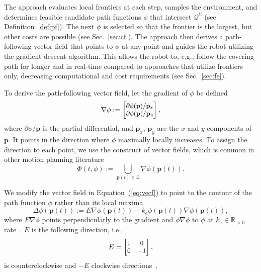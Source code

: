 \documentclass[lettersize,journal,twoside]{IEEEtran}
\theoremstyle{definition}
\begin{document}
The %
approach evaluates local frontiers at each step, samples the environment, and determines feasible candidate path functions $\phi$ that intersect $\mathcal{Q}^V$ (see Definition~\ref{def:pf}).
The next $\phi$ is selected so that the frontier is the largest, but other costs are possible (see Sec.~\ref{sec:cf}). 
The %
approach then derives a path-following vector field that points to $\phi$ at any point and guides the robot utilizing the gradient descent algorithm. This allows the robot to, e.g., follow the covering path for longer and in real-time compared to approaches that utilize frontiers only, decreasing computational and cost requirements (see Sec.~\ref{sec:fe}).

To derive the path-following vector field, let the gradient of $\phi$ be defined
\begin{equation}\small
  \nabla\phi:=\begin{bmatrix}
    \partial\phi(\mathbf{p})/\mathbf{p}_x\\
    \partial\phi(\mathbf{p})/\mathbf{p}_y
  \end{bmatrix},
\end{equation}
where $\partial\phi/\mathbf{p}$ is the partial differential, and $\mathbf{p}_x$, $\mathbf{p}_y$ are the $x$ and $y$ components of $\mathbf{p}$.
It points in the direction where $\phi$ maximally locally increases. To assign the direction to each point, we use the construct of vector fields, which is common in other motion planning literature~\cite{%
garcia2017guidance,goncalves2010vector}
\begin{equation}\label{eq:vecf}
  \Phi(t,\phi):={\textstyle \bigcup\limits_{\mathbf{p}(t)\in\mathcal{Q}}}\nabla\phi(\mathbf{p}(t)).
\end{equation}

We modify the vector field in Equation~(\ref{eq:vecf}) to point to the contour of the path function $\phi$ rather than its local maxima
\begin{equation}\label{eq:pfvf}
  \Delta\phi(\mathbf{p}(t)):=E\nabla\phi(\mathbf{p}(t))-k_e\phi(\mathbf{p}(t))\nabla\phi(\mathbf{p}(t)),
\end{equation}
where $E\nabla\phi$ points perpendicularly to the gradient and $\phi\nabla\phi$ to $\phi$ at $k_e\in\mathbb{R}_{>0}$ rate~\cite{garcia2017guidance}. $E$ is the following direction, i.e.,
\begin{equation}\small
  E=\begin{bmatrix}
    1 & 0\\ 0 & -1
  \end{bmatrix},
\end{equation}
is counterclockwise and $-E$ clockwise directions~\cite{seewaldphdthesis}.
\end{document}
